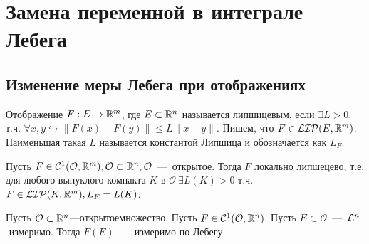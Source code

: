 \section{Замена переменной в интеграле Лебега}
\subsection{Изменение меры Лебега при отображениях}
\begin{reminder}
    Отображение $F: E \rightarrow \mathbb{R}^m$, где $E \subset \mathbb{R}^n$ называется липшицевым, если $\exists L > 0$, т.ч. $\forall x, y \hookrightarrow \|F(x) - F(y)\| \leq L\|x - y\|$. Пишем, что $F \in \mathcal{LIP}(E, \mathbb{R}^m)$. Наименьшая такая $L$ называется константой Липшица и обозначается как $L_F$.
\end{reminder}
\begin{fact}
    Пусть $F \in \mathcal{C}^1(\mathcal{O}, \mathbb{R}^m), \mathcal{O} \subset \mathbb{R}^n, \mathcal{O}$~---~открытое. Тогда $F$ локально липшецево, т.е. для любого выпуклого компакта $K$ в $\mathcal{O} \   \exists L(K) > 0$ т.ч. $F \in \mathcal{LIP}(K, \mathbb{R}^m), L_F = L(K)$.
\end{fact}
\begin{theorem}
    Пусть $\mathcal{O} \subset \mathbb{R}^n$---открытоемножество. Пусть $F \in \mathcal{C}^1(\mathcal{O}, \mathbb{R}^n)$. Пусть $E \subset \mathcal{O}$~---~$\mathcal{L}^n$-измеримо. Тогда $F(E)$~---~измеримо по Лебегу.
\end{theorem}
